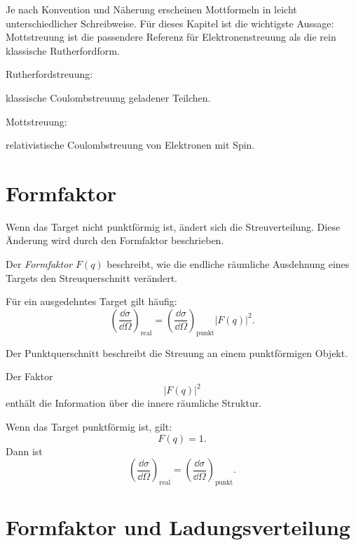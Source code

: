 \begin{notebox}
Je nach Konvention und Näherung erscheinen Mottformeln in leicht unterschiedlicher
Schreibweise.
Für dieses Kapitel ist die wichtigste Aussage:
Mottstreuung ist die passendere Referenz für Elektronenstreuung als die rein klassische
Rutherfordform.
\end{notebox}

\begin{examtipbox}
Rutherfordstreuung:
\begin{center}
klassische Coulombstreuung geladener Teilchen.
\end{center}

Mottstreuung:
\begin{center}
relativistische Coulombstreuung von Elektronen mit Spin.
\end{center}
\end{examtipbox}

\section{Formfaktor}

Wenn das Target nicht punktförmig ist, ändert sich die Streuverteilung.
Diese Änderung wird durch den Formfaktor beschrieben.

\begin{definitionbox}
Der \emph{Formfaktor} $F(q)$ beschreibt, wie die endliche räumliche Ausdehnung eines
Targets den Streuquerschnitt verändert.
\end{definitionbox}

\begin{formulabox}
Für ein ausgedehntes Target gilt häufig:
\[
    \left(\frac{\dd\sigma}{\dd\Omega}\right)_{\mathrm{real}}
    =
    \left(\frac{\dd\sigma}{\dd\Omega}\right)_{\mathrm{punkt}}
    |F(q)|^2.
\]
\end{formulabox}

\begin{conceptbox}
Der Punktquerschnitt beschreibt die Streuung an einem punktförmigen Objekt.

Der Faktor
\[
    |F(q)|^2
\]
enthält die Information über die innere räumliche Struktur.

Wenn das Target punktförmig ist, gilt:
\[
    F(q)=1.
\]
Dann ist
\[
    \left(\frac{\dd\sigma}{\dd\Omega}\right)_{\mathrm{real}}
    =
    \left(\frac{\dd\sigma}{\dd\Omega}\right)_{\mathrm{punkt}}.
\]
\end{conceptbox}

\section{Formfaktor und Ladungsverteilung}

